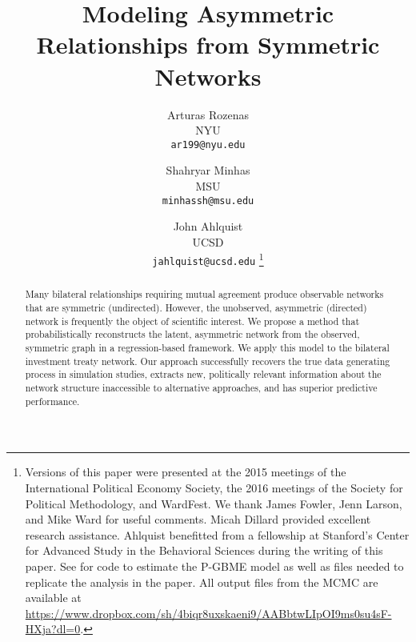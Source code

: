 \documentclass[a4paper, 12pt]{article}
\begin{document}
\title{{\bf Modeling Asymmetric Relationships from Symmetric Networks}}

\author{
  Arturas Rozenas\\
{\small NYU}\\
  {\small \texttt{ar199@nyu.edu}}
\and
  Shahryar Minhas\\
{\small MSU}\\
  {\small \texttt{minhassh@msu.edu}}
  \and
  John Ahlquist\\
{\small UCSD}\\
  {\small \texttt{jahlquist@ucsd.edu}}
\thanks{Versions of this paper were presented at the 2015 meetings of the International Political Economy Society, the 2016 meetings of the Society for Political Methodology, and WardFest.  We thank James Fowler, Jenn Larson, and Mike Ward for useful comments. Micah Dillard provided excellent research assistance.  Ahlquist benefitted from a fellowship at Stanford's Center for Advanced Study in the Behavioral Sciences during the writing of this paper.  See \citet{rozenas:etal:data} for code to estimate the P-GBME model as well as files needed to replicate the analysis in the paper.  All output files from the MCMC are available at \url{https://www.dropbox.com/sh/4biqr8uxskaeni9/AABbtwLIpOI9ms0su4sF-HXja?dl=0}.}}

\maketitle 
\thispagestyle{empty}

\bigskip

\begin{abstract}
 \noindent Many bilateral relationships requiring mutual agreement produce observable networks that are symmetric (undirected). However, the unobserved, asymmetric (directed) network is frequently the object of scientific interest. We propose a method that probabilistically reconstructs the latent, asymmetric network from the observed, symmetric graph in a regression-based framework. We apply this model to the bilateral investment treaty network. Our approach successfully recovers the true data generating process in simulation studies, extracts new, politically relevant information about the network structure inaccessible to alternative approaches, and has superior predictive performance. 
\end{abstract}

\clearpage

\singlespacing






\singlespacing


\end{document}
